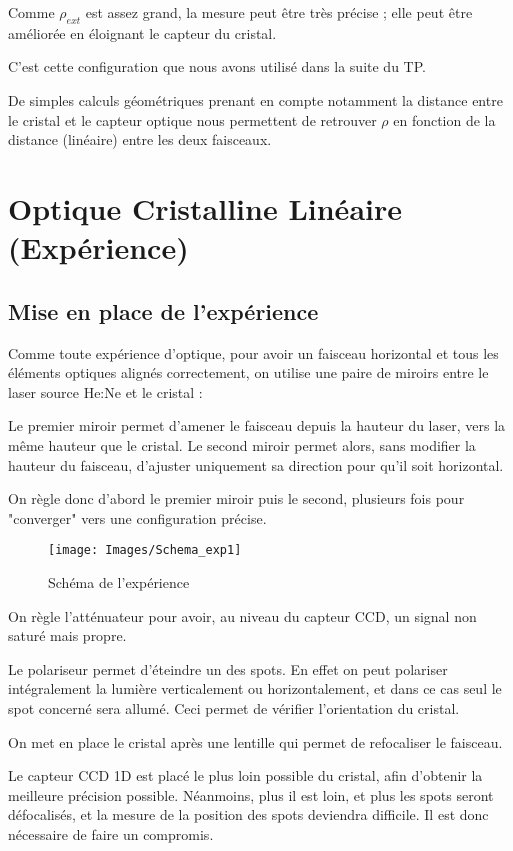\documentclass[a4paper,11pt]{report}
\begin{document}
Comme $\rho_{ext}$ est assez grand, la mesure peut être très précise ; elle peut être améliorée en éloignant le capteur du cristal.

C'est cette configuration que nous avons utilisé dans la suite du TP.

De simples calculs géométriques prenant en compte notamment la distance entre le cristal et le capteur optique nous permettent de retrouver $\rho$ en fonction de la distance (linéaire) entre les deux faisceaux.

\chapter{Optique Cristalline Linéaire (Expérience)} \label{OCLExp}
\section{Mise en place de l'expérience}
Comme toute expérience d'optique, pour avoir un faisceau horizontal et tous les éléments optiques alignés correctement, on utilise une paire de miroirs entre le laser source He:Ne et le cristal : 

Le premier miroir permet d'amener le faisceau depuis la hauteur du laser, vers la même hauteur que le cristal. Le second miroir permet alors, sans modifier la hauteur du faisceau, d'ajuster uniquement sa direction pour qu'il soit horizontal.

On règle donc d'abord le premier miroir puis le second, plusieurs fois pour "converger" vers une configuration précise.

\begin{figure}[h]
    \begin{center}
        \texttt{[image: Images/Schema\_exp1]}
        \caption{Schéma de l'expérience}
        \label{schema_exp1}
    \end{center}
\end{figure}

On règle l'atténuateur pour avoir, au niveau du capteur CCD, un signal non saturé mais propre.

Le polariseur permet d'éteindre un des spots. En effet on peut polariser intégralement la lumière verticalement ou horizontalement, et dans ce cas seul le spot concerné sera allumé. Ceci permet de vérifier l'orientation du cristal.

On met en place le cristal après une lentille qui permet de refocaliser le faisceau.

Le capteur CCD 1D est placé le plus loin possible du cristal, afin d'obtenir la meilleure précision possible. Néanmoins, plus il est loin, et plus les spots seront défocalisés, et la mesure de la position des spots deviendra difficile. Il est donc nécessaire de faire un compromis.
\end{document}
